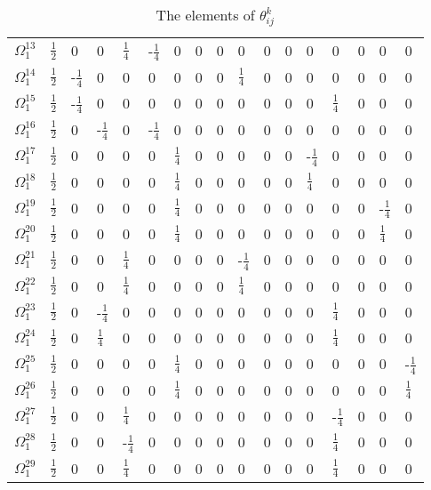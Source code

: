 \begin{tiny}
\begin{table}[]
\begin{tabular}{lllllllllllllllll}
            $\Omega_{1}^{13}$ & $\frac{1}{2}$	&	0	&	0	&	$\frac{1}{4}$	&	-$\frac{1}{4}$	&	0	&	0	&	0	&	0	&	0	&	0	&	0	&	0	&	0	&	0	&	0 \\ 
            $\Omega_{1}^{14}$ & $\frac{1}{2}$	&	-$\frac{1}{4}$	&	0	&	0	&	0	&	0	&	0	&	0	&	$\frac{1}{4}$	&	0	&	0	&	0	&	0	&	0	&	0	&	0 \\ 
            $\Omega_{1}^{15}$ & $\frac{1}{2}$	&	-$\frac{1}{4}$	&	0	&	0	&	0	&	0	&	0	&	0	&	0	&	0	&	0	&	0	&	$\frac{1}{4}$	&	0	&	0	&	0 \\ 
            $\Omega_{1}^{16}$ & $\frac{1}{2}$	&	0	&	-$\frac{1}{4}$	&	0	&	-$\frac{1}{4}$	&	0	&	0	&	0	&	0	&	0	&	0	&	0	&	0	&	0	&	0	&	0 \\ 
            $\Omega_{1}^{17}$ & $\frac{1}{2}$	&	0	&	0	&	0	&	0	&	$\frac{1}{4}$	&	0	&	0	&	0	&	0	&	0	&	-$\frac{1}{4}$	&	0	&	0	&	0	&	0 \\ 
            $\Omega_{1}^{18}$ & $\frac{1}{2}$	&	0	&	0	&	0	&	0	&	$\frac{1}{4}$	&	0	&	0	&	0	&	0	&	0	&	$\frac{1}{4}$	&	0	&	0	&	0	&	0 \\ 
            $\Omega_{1}^{19}$ & $\frac{1}{2}$	&	0	&	0	&	0	&	0	&	$\frac{1}{4}$	&	0	&	0	&	0	&	0	&	0	&	0	&	0	&	0	&	-$\frac{1}{4}$	&	0 \\ 
            $\Omega_{1}^{20}$ & $\frac{1}{2}$	&	0	&	0	&	0	&	0	&	$\frac{1}{4}$	&	0	&	0	&	0	&	0	&	0	&	0	&	0	&	0	&	$\frac{1}{4}$	&	0 \\ 
            $\Omega_{1}^{21}$ & $\frac{1}{2}$	&	0	&	0	&	$\frac{1}{4}$	&	0	&	0	&	0	&	0	&	-$\frac{1}{4}$	&	0	&	0	&	0	&	0	&	0	&	0	&	0 \\ 
            $\Omega_{1}^{22}$ & $\frac{1}{2}$	&	0	&	0	&	$\frac{1}{4}$	&	0	&	0	&	0	&	0	&	$\frac{1}{4}$	&	0	&	0	&	0	&	0	&	0	&	0	&	0 \\ 
            $\Omega_{1}^{23}$ & $\frac{1}{2}$	&	0	&	-$\frac{1}{4}$	&	0	&	0	&	0	&	0	&	0	&	0	&	0	&	0	&	0	&	$\frac{1}{4}$	&	0	&	0	&	0 \\ 
            $\Omega_{1}^{24}$ & $\frac{1}{2}$	&	0	&	$\frac{1}{4}$	&	0	&	0	&	0	&	0	&	0	&	0	&	0	&	0	&	0	&	$\frac{1}{4}$	&	0	&	0	&	0 \\ 
            $\Omega_{1}^{25}$ & $\frac{1}{2}$	&	0	&	0	&	0	&	0	&	$\frac{1}{4}$	&	0	&	0	&	0	&	0	&	0	&	0	&	0	&	0	&	0	&	-$\frac{1}{4}$ \\ 
            $\Omega_{1}^{26}$ & $\frac{1}{2}$	&	0	&	0	&	0	&	0	&	$\frac{1}{4}$	&	0	&	0	&	0	&	0	&	0	&	0	&	0	&	0	&	0	&	$\frac{1}{4}$ \\ 
            $\Omega_{1}^{27}$ & $\frac{1}{2}$	&	0	&	0	&	$\frac{1}{4}$	&	0	&	0	&	0	&	0	&	0	&	0	&	0	&	0	&	-$\frac{1}{4}$	&	0	&	0	&	0 \\ 
            $\Omega_{1}^{28}$ & $\frac{1}{2}$	&	0	&	0	&	-$\frac{1}{4}$	&	0	&	0	&	0	&	0	&	0	&	0	&	0	&	0	&	$\frac{1}{4}$	&	0	&	0	&	0 \\ 
            $\Omega_{1}^{29}$ & $\frac{1}{2}$	&	0	&	0	&	$\frac{1}{4}$	&	0	&	0	&	0	&	0	&	0	&	0	&	0	&	0	&	$\frac{1}{4}$	&	0	&	0	&	0 \\ 
                         
        \end{tabular}
        \caption{The elements of $\theta_{ij}^{k}$}
        \end{table}
\end{tiny}
